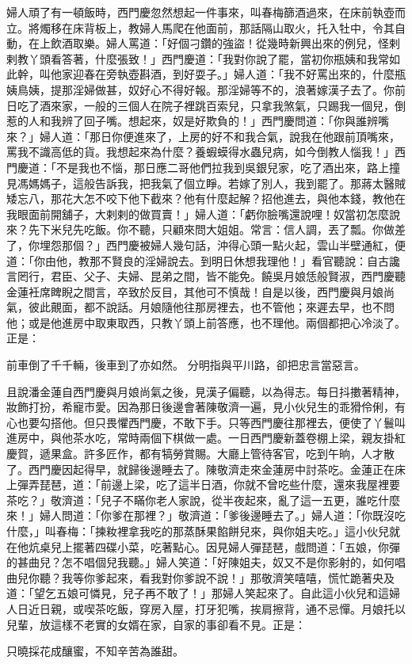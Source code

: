 婦人頑了有一頓飯時，西門慶忽然想起一件事來，叫春梅篩酒過來，在床前執壺而立。將燭移在床背板上，教婦人馬爬在他面前，那話隔山取火，托入牡中，令其自動，在上飲酒取樂。婦人罵道：「好個刁鑽的強盜！從幾時新興出來的例兒，怪剌剌教丫頭看答著，什麼張致！」西門慶道：「我對你說了罷，當初你瓶姨和我常如此幹，叫他家迎春在旁執壺斟酒，到好耍子。」婦人道：「我不好罵出來的，什麼瓶姨鳥姨，提那淫婦做甚，奴好心不得好報。那淫婦等不的，浪著嫁漢子去了。你前日吃了酒來家，一般的三個人在院子裡跳百索兒，只拿我煞氣，只踢我一個兒，倒惹的人和我辨了回子嘴。想起來，奴是好欺負的！」西門慶問道：「你與誰辨嘴來？」婦人道：「那日你便進來了，上房的好不和我合氣，說我在他跟前頂嘴來，罵我不識高低的貨。我想起來為什麼？養蝦蟆得水蟲兒病，如今倒教人惱我！」西門慶道：「不是我也不惱，那日應二哥他們拉我到吳銀兒家，吃了酒出來，路上撞見馮媽媽子，這般告訴我，把我氣了個立睜。若嫁了別人，我到罷了。那蔣太醫賊矮忘八，那花大怎不咬下他下截來？他有什麼起解？招他進去，與他本錢，教他在我眼面前開舖子，大剌剌的做買賣！」婦人道：「虧你臉嘴還說哩！奴當初怎麼說來？先下米兒先吃飯。你不聽，只顧來問大姐姐。常言：信人調，丟了瓢。你做差了，你埋怨那個？」西門慶被婦人幾句話，沖得心頭一點火起，雲山半壁通紅，便道：「你由他，教那不賢良的淫婦說去。到明日休想我理他！」看官聽說：自古讒言罔行，君臣、父子、夫婦、昆弟之間，皆不能免。饒吳月娘恁般賢淑，西門慶聽金蓮衽席睥睨之間言，卒致於反目，其他可不慎哉！自是以後，西門慶與月娘尚氣，彼此覿面，都不說話。月娘隨他往那房裡去，也不管他；來遲去早，也不問他；或是他進房中取東取西，只教丫頭上前答應，也不理他。兩個都把心冷淡了。正是：

前車倒了千千輛，後車到了亦如然。
分明指與平川路，卻把忠言當惡言。

且說潘金蓮自西門慶與月娘尚氣之後，見漢子偏聽，以為得志。每日抖擻著精神，妝飾打扮，希寵市愛。因為那日後邊會著陳敬濟一遍，見小伙兒生的乖猾伶俐，有心也要勾搭他。但只畏懼西門慶，不敢下手。只等西門慶往那裡去，便使了丫鬟叫進房中，與他茶水吃，常時兩個下棋做一處。一日西門慶新蓋卷棚上梁，親友掛紅慶賀，遞果盒。許多匠作，都有犒勞賞賜。大廳上管待客官，吃到午晌，人才散了。西門慶因起得早，就歸後邊睡去了。陳敬濟走來金蓮房中討茶吃。金蓮正在床上彈弄琵琶，道：「前邊上梁，吃了這半日酒，你就不曾吃些什麼，還來我屋裡要茶吃？」敬濟道：「兒子不瞞你老人家說，從半夜起來，亂了這一五更，誰吃什麼來！」婦人問道：「你爹在那裡？」敬濟道：「爹後邊睡去了。」婦人道：「你既沒吃什麼，」叫春梅：「揀籹裡拿我吃的那蒸酥果餡餅兒來，與你姐夫吃。」這小伙兒就在他炕桌兒上擺著四碟小菜，吃著點心。因見婦人彈琵琶，戲問道：「五娘，你彈的甚曲兒？怎不唱個兒我聽。」婦人笑道：「好陳姐夫，奴又不是你影射的，如何唱曲兒你聽？我等你爹起來，看我對你爹說不說！」那敬濟笑嘻嘻，慌忙跪著央及道：「望乞五娘可憐見，兒子再不敢了！」那婦人笑起來了。自此這小伙兒和這婦人日近日親，或喫茶吃飯，穿房入屋，打牙犯嘴，挨肩擦背，通不忌憚。月娘托以兒輩，放這樣不老實的女婿在家，自家的事卻看不見。正是：

只曉採花成釀蜜，不知辛苦為誰甜。

